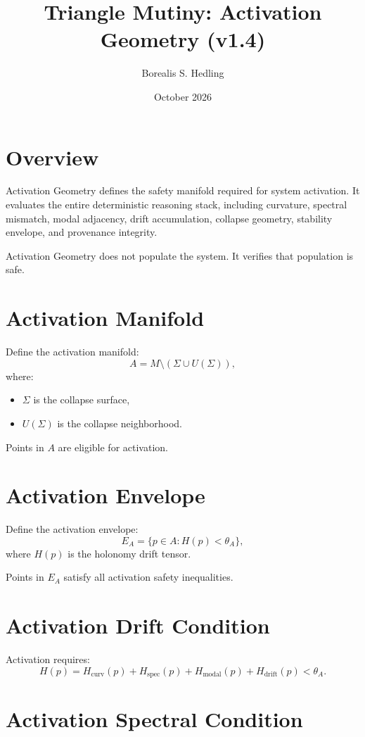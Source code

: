 \documentclass[11pt]{article}
\title{Triangle Mutiny: Activation Geometry (v1.4)}
\author{Borealis S. Hedling}
\date{October 2026}
\begin{document}
\maketitle

\section{Overview}

Activation Geometry defines the safety manifold required for system activation.
It evaluates the entire deterministic reasoning stack, including curvature,
spectral mismatch, modal adjacency, drift accumulation, collapse geometry,
stability envelope, and provenance integrity.

Activation Geometry does not populate the system. It verifies that population
is safe.

\section{Activation Manifold}

Define the activation manifold:
\[
A = M \setminus (\Sigma \cup U(\Sigma)),
\]
where:
\begin{itemize}
  \item $\Sigma$ is the collapse surface,
  \item $U(\Sigma)$ is the collapse neighborhood.
\end{itemize}

Points in $A$ are eligible for activation.

\section{Activation Envelope}

Define the activation envelope:
\[
E_A = \{ p \in A : H(p) < \theta_A \},
\]
where $H(p)$ is the holonomy drift tensor.

Points in $E_A$ satisfy all activation safety inequalities.

\section{Activation Drift Condition}

Activation requires:
\[
H(p)
  = H_{\mathrm{curv}}(p)
  + H_{\mathrm{spec}}(p)
  + H_{\mathrm{modal}}(p)
  + H_{\mathrm{drift}}(p)
  < \theta_A.
\]

\section{Activation Spectral Condition}
\end{document}
